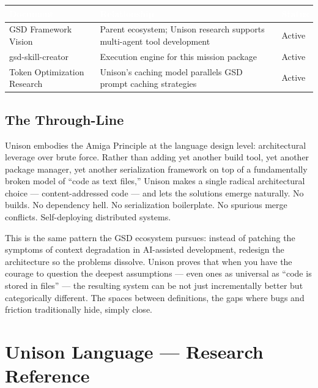\documentclass[11pt,letterpaper]{article}
\newcommand{\stageheader}[2]{%
  \noindent\colorbox{#2}{\makebox[\textwidth][l]{%
    \textcolor{white}{\bfseries\sffamily\hspace{6pt}#1\hspace{6pt}}}}%
  \vspace{0.5em}\par%
}
\newcommand{\tableheader}[1]{\textbf{\sffamily\textcolor{white}{#1}}}
\begin{document}
\begin{center}
\begin{tabularx}{\textwidth}{L{4cm}XL{3cm}}
\toprule
{}
\tableheader{Document} & \tableheader{Relationship} & \tableheader{Status} \\
\midrule
GSD Framework Vision & Parent ecosystem; Unison research supports multi-agent tool development & Active \\
gsd-skill-creator & Execution engine for this mission package & Active \\
Token Optimization Research & Unison's caching model parallels GSD prompt caching strategies & Active \\
\bottomrule
\end{tabularx}
\end{center}

\subsection{The Through-Line}

Unison embodies the Amiga Principle at the language design level: architectural leverage over brute force. Rather than adding yet another build tool, yet another package manager, yet another serialization framework on top of a fundamentally broken model of ``code as text files,'' Unison makes a single radical architectural choice --- content-addressed code --- and lets the solutions emerge naturally. No builds. No dependency hell. No serialization boilerplate. No spurious merge conflicts. Self-deploying distributed systems.

This is the same pattern the GSD ecosystem pursues: instead of patching the symptoms of context degradation in AI-assisted development, redesign the architecture so the problems dissolve. Unison proves that when you have the courage to question the deepest assumptions --- even ones as universal as ``code is stored in files'' --- the resulting system can be not just incrementally better but categorically different. The spaces between definitions, the gaps where bugs and friction traditionally hide, simply close.

\newpage

\stageheader{STAGE 2 --- RESEARCH REFERENCE}{secondary}

\section{Unison Language --- Research Reference}
\end{document}

